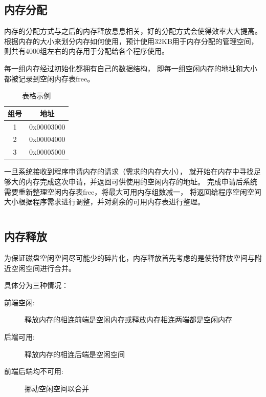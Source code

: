 \subsection{内存分配}

内存的分配方式与之后的内存释放息息相关，好的分配方式会使得效率大大提高。
根据内存的大小来划分内存如何使用，预计使用32KB用于内存分配的管理空间，
则共有4000组左右的内存用于分配给各个程序使用。

每一组内存经过初始化都拥有自己的数据结构，
即每一组空闲内存的地址和大小都被记录到空闲内存表free。

\begin{table}[!ht]
  \centering
  \begin{tabular}{|c{4cm}|c{8cm}|}
    \hline 
    组号 & 地址 \\
    \hline 
    1 & 0x00003000 \\ 
    \hline 
    2 & 0x00004000 \\
    \hline 
    3 & 0x00005000 \\
    \hline
  \end{tabular}
  \caption{表格示例}
  \label{tab:hello}
\end{table}

一旦系统接收到程序申请内存的请求（需求的内存大小），
就开始在内存中寻找足够大的内存完成这次申请，并返回可供使用的空闲内存的地址。
完成申请后系统需要重新整理空闲内存表free，将最大可用内存组数减一，
将返回给程序空闲空间大小根据程序需求进行调整，并对剩余的可用内存表进行整理。

\begin{listing}[H]
  \inputminted[tabsize=2, firstline=68, lastline=78,
  linenos=true]{c}{../ZOS/src/kernel/memory.c}
\end{listing}

\newpage
\subsection{内存释放}

为保证磁盘空闲空间尽可能少的碎片化，内存释放首先考虑的是使待释放空间与附近空闲空间进行合并。

具体分为三种情况：

\begin{description}
\item[前端空闲:]释放内存的相连前端是空闲内存或释放内存相连两端都是空闲内存
\item[后端可用:]释放内存的相连后端是空闲空间
\item[前端后端均不可用:]挪动空闲空间以合并
\end{description}


